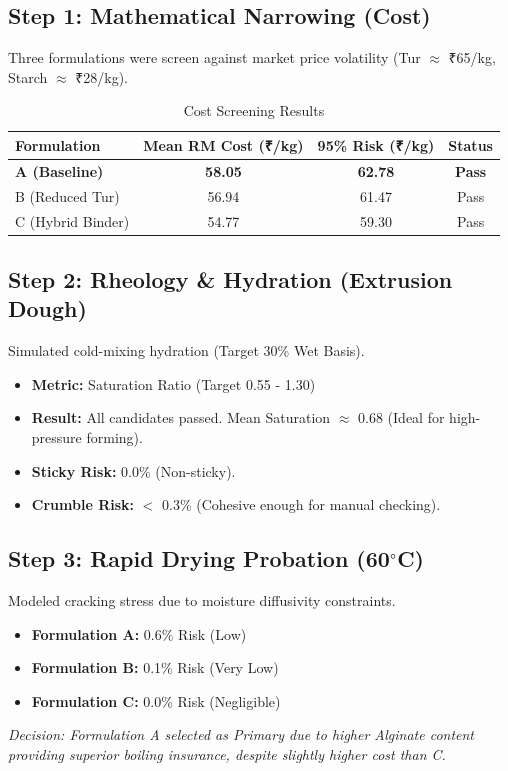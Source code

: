 \documentclass{article}
\begin{document}
\subsection{Step 1: Mathematical Narrowing (Cost)}
Three formulations were screen against market price volatility (Tur $\approx$ ₹65/kg, Starch $\approx$ ₹28/kg).

\begin{table}[h]
\centering
\begin{tabular}{lccc}
\toprule
Formulation & Mean RM Cost (₹/kg) & 95\% Risk (₹/kg) & Status \\
\midrule
\textbf{A (Baseline)} & \textbf{58.05} & \textbf{62.78} & \textbf{Pass} \\
B (Reduced Tur) & 56.94 & 61.47 & Pass \\
C (Hybrid Binder) & 54.77 & 59.30 & Pass \\
\bottomrule
\end{tabular}
\caption{Cost Screening Results}
\end{table}

\subsection{Step 2: Rheology \& Hydration (Extrusion Dough)}
Simulated cold-mixing hydration (Target 30\% Wet Basis).
\begin{itemize}
    \item \textbf{Metric:} Saturation Ratio (Target 0.55 - 1.30)
    \item \textbf{Result:} All candidates passed. Mean Saturation $\approx$ 0.68 (Ideal for high-pressure forming).
    \item \textbf{Sticky Risk:} 0.0\% (Non-sticky).
    \item \textbf{Crumble Risk:} $<$ 0.3\% (Cohesive enough for manual checking).
\end{itemize}

\subsection{Step 3: Rapid Drying Probation (60$^\circ$C)}
Modeled cracking stress due to moisture diffusivity constraints.
\begin{itemize}
    \item \textbf{Formulation A:} 0.6\% Risk (Low)
    \item \textbf{Formulation B:} 0.1\% Risk (Very Low)
    \item \textbf{Formulation C:} 0.0\% Risk (Negligible)
\end{itemize}
\textit{Decision: Formulation A selected as Primary due to higher Alginate content providing superior boiling insurance, despite slightly higher cost than C.}
\end{document}
